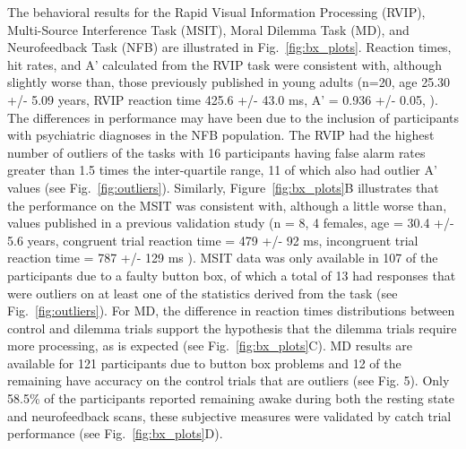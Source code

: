 The behavioral results for the Rapid Visual Information Processing (RVIP), Multi-Source Interference Task (MSIT), Moral Dilemma Task (MD), and Neurofeedback Task (NFB) are illustrated in Fig.~\ref{fig:bx_plots}. Reaction times, hit rates, and A’ calculated from the RVIP task were consistent with, although slightly worse than, those previously published in young adults (n=20, age 25.30 +/- 5.09 years, RVIP reaction time 425.6 +/- 43.0 ms, A’ = 0.936 +/- 0.05, \cite{Turner2003}). The differences in performance may have been due to the inclusion of participants with psychiatric diagnoses in the NFB population. The RVIP had the highest number of outliers of the tasks with 16 participants having false alarm rates greater than 1.5 times the inter-quartile range, 11 of which also had outlier A’ values (see Fig.~\ref{fig:outliers}). Similarly, Figure~\ref{fig:bx_plots}B illustrates that the performance on the MSIT was consistent with, although a little worse than, values published in a previous validation study (n = 8, 4 females, age = 30.4 +/- 5.6 years, congruent trial reaction time = 479 +/- 92 ms, incongruent trial reaction time = 787 +/- 129 ms \cite{Bush2003}). MSIT data was only available in 107 of the participants due to a faulty button box, of which a total of 13 had responses that were outliers on at least one of the statistics derived from the task (see Fig.~\ref{fig:outliers}). For MD, the difference in reaction times distributions between control and dilemma trials support the hypothesis that the dilemma trials require more processing, as is expected \cite{Harrison2008} (see Fig.~\ref{fig:bx_plots}C). MD results are available for 121 participants due to button box problems and 12 of the remaining have accuracy on the control trials that are outliers (see Fig. 5). Only 58.5\% of the participants reported remaining awake during both the resting state and neurofeedback scans, these subjective measures were validated by catch trial performance (see Fig.~\ref{fig:bx_plots}D).

